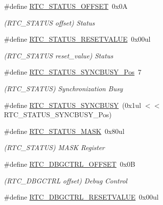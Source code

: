 \begin{DoxyCompactItemize}
\#define \mbox{\hyperlink{group___s_a_m_d21___r_t_c_gad3d3ef6a024619b20d8d13850cd54214}{R\+T\+C\+\_\+\+S\+T\+A\+T\+U\+S\+\_\+\+O\+F\+F\+S\+ET}}~0x0A
\begin{DoxyCompactList}\small\item\em (R\+T\+C\+\_\+\+S\+T\+A\+T\+US offset) Status \end{DoxyCompactList}\item 
\#define \mbox{\hyperlink{group___s_a_m_d21___r_t_c_gac1a10729a42ef5cc6ca486c53c751ac5}{R\+T\+C\+\_\+\+S\+T\+A\+T\+U\+S\+\_\+\+R\+E\+S\+E\+T\+V\+A\+L\+UE}}~0x00ul
\begin{DoxyCompactList}\small\item\em (R\+T\+C\+\_\+\+S\+T\+A\+T\+US reset\+\_\+value) Status \end{DoxyCompactList}\item 
\#define \mbox{\hyperlink{group___s_a_m_d21___r_t_c_gaeb898eff5412d9be301d52ba3768dec1}{R\+T\+C\+\_\+\+S\+T\+A\+T\+U\+S\+\_\+\+S\+Y\+N\+C\+B\+U\+S\+Y\+\_\+\+Pos}}~7
\begin{DoxyCompactList}\small\item\em (R\+T\+C\+\_\+\+S\+T\+A\+T\+US) Synchronization Busy \end{DoxyCompactList}\item 
\#define \mbox{\hyperlink{group___s_a_m_d21___r_t_c_gad239818795a48c2c623f6dc63b4975cd}{R\+T\+C\+\_\+\+S\+T\+A\+T\+U\+S\+\_\+\+S\+Y\+N\+C\+B\+U\+SY}}~(0x1ul $<$$<$ R\+T\+C\+\_\+\+S\+T\+A\+T\+U\+S\+\_\+\+S\+Y\+N\+C\+B\+U\+S\+Y\+\_\+\+Pos)
\item 
\#define \mbox{\hyperlink{group___s_a_m_d21___r_t_c_ga740d23a8a4687563d0ac079dd050194f}{R\+T\+C\+\_\+\+S\+T\+A\+T\+U\+S\+\_\+\+M\+A\+SK}}~0x80ul
\begin{DoxyCompactList}\small\item\em (R\+T\+C\+\_\+\+S\+T\+A\+T\+US) M\+A\+SK Register \end{DoxyCompactList}\item 
\#define \mbox{\hyperlink{group___s_a_m_d21___r_t_c_gaac74425380ba21315855439dc4408e4e}{R\+T\+C\+\_\+\+D\+B\+G\+C\+T\+R\+L\+\_\+\+O\+F\+F\+S\+ET}}~0x0B
\begin{DoxyCompactList}\small\item\em (R\+T\+C\+\_\+\+D\+B\+G\+C\+T\+RL offset) Debug Control \end{DoxyCompactList}\item 
\#define \mbox{\hyperlink{group___s_a_m_d21___r_t_c_ga19592154d271f8871d1a9443362a37ee}{R\+T\+C\+\_\+\+D\+B\+G\+C\+T\+R\+L\+\_\+\+R\+E\+S\+E\+T\+V\+A\+L\+UE}}~0x00ul
$$
\end{DoxyCompactItemize}
